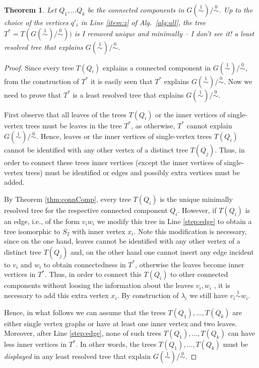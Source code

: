 \documentclass[smallextended]{svjour3}
\newcommand{\rev}[1]{\begingroup\color{blue}#1\endgroup}
\newcommand{\remove}[1]{\begingroup\tiny\color{yellow}#1\endgroup}
\newcommand{\mh}[1]{\begingroup\color{magenta}#1\endgroup}
\newcommand{\Ro}{\mathrel{\overset{0}{\sim}}}
\newcommand{\Rl}{\mathrel{\overset{1}{\sim}}}
\newtheorem{thm}{Theorem}
\begin{document}
\begin{thm}
  Let $Q_1,\dots Q_k$ be the connected components in $G(\Rl)/\Ro$.  Up to
  the choice of the vertices $q'_i$ in Line \ref{item:z} of Alg.\
  \ref{alg:all}, the tree $T^* = T(G(\Rl)/\Ro))$ is 
	\mh{I removed unique and minimally -- I don't see it!}
	\rev{a least} 
	resolved tree that explains $G(\Rl)/\Ro$.
  \label{thm:star-tree}
\end{thm}
\begin{proof}
	\remove{
  Since every tree $T(Q_i)$ explains a connected component in $G(\Rl)/\Ro$,
  from the construction of $T^*$ it is easily seen that $T^*$ explains
  $G(\Rl)/\Ro$.  Now we need to prove that $T^*$ is a least resolved
  tree that explains $G(\Rl)/\Ro$.
        
  First observe that all leaves of the trees $T(Q_i)$ or the inner vertices
  of single-vertex trees must be leaves in the tree $T^*$, as otherwise,
  $T^*$ cannot explain $G(\Rl)/\Ro$.  Hence, leaves or the inner vertices
  of single-vertex trees $T(Q_i)$ cannot be identified with any other
  vertex of a distinct tree $T(Q_j)$.  Thus, in order to connect these
  trees inner vertices (except the  inner vertices of single-vertex
  trees) must be identified or edges and possibly extra vertices must be
  added.

  By Theorem \ref{thm:connComp}, every tree $T(Q_i)$ is the unique minimally
  resolved tree for the respective connected component $Q_i$.  However, if
  $T(Q_i)$ is an edge, i.e., of the form $v_iw_i$ we modify this tree in
  Line \ref{step:edge} to obtain a tree isomorphic to $S_2$ with inner
  vertex $x_i$.  Note this modification is necessary, since on the one
  hand, leaves cannot be identified with any other vertex of a distinct
  tree $T(Q_j)$ and, on the other hand one cannot insert any edge incident
  to $v_i$ and $w_i$ to obtain connectedness in $T^*$, otherwise the leaves
  become inner vertices in $T^*$. Thus, in order to connect this $T(Q_i)$
  to other connected components without loosing the information about the
  leaves $v_i,w_i$ , it is necessary to add this extra vertex $x_i$.  By
  construction of $\lambda_i$ we still have $v_i\Rl w_i$.

  Hence, in what follows we can assume that the trees $T(Q_1),\dots,T(Q_k)$
  are either single vertex graphs or have at least one inner vertex and two
  leaves.  Moreover, after Line \ref{step:edge}, none of such trees
  $T(Q_1),\dots,T(Q_k)$ can have less inner vertices in $T^*$. In other
  words, the trees $T(Q_1),\dots,T(Q_k)$ must be \emph{displayed} in any
  least resolved tree that explain $G(\Rl)/\Ro$.
        
}
\end{proof}
\end{document}
